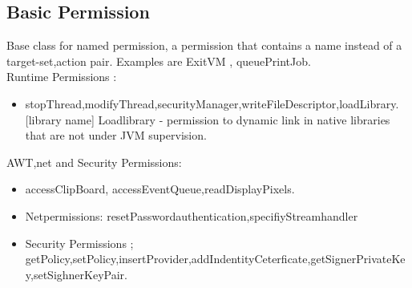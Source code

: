 \documentclass[a4paper,10pt]{scrreprt}
\begin{document}
\subsection{Basic Permission}
Base class for named permission, a permission that contains a name instead of a target-set,action pair.
Examples are ExitVM , queuePrintJob.\\
Runtime Permissions :
\begin{itemize}
 \item stopThread,modifyThread,securityManager,writeFileDescriptor,loadLibrary.[library name]
 \subitem Loadlibrary - permission to dynamic link in native libraries that are not under JVM supervision.
\end{itemize}

AWT,net and Security Permissions:\\
\begin{itemize}
 \item accessClipBoard, accessEventQueue,readDisplayPixels.
 \item Netpermissions: resetPasswordauthentication,specifiyStreamhandler
 \item Security Permissions ; 
getPolicy,setPolicy,insertProvider,addIndentityCeterficate,getSignerPrivateKey,setSighnerKeyPair.
\end{itemize}
\end{document}
